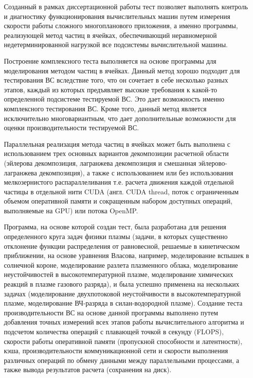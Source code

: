 Созданный в рамках диссертационной работы тест позволяет выполнять контроль и диагностику функционирования вычислительных машин путем измерения скорости работы сложного многопланового приложения, а именно программы, реализующей метод частиц в ячейках, обеспечивающий неравномерной недетерминированной нагрузкой все подсистемы вычислительной машины.

{\methods} Построение комплексного теста выполняется на основе программы для моделирования методом частиц в ячейках. Данный метод хорошо подходит для тестирования ВС вследствие того, что он сочетает в себе несколько разных этапов, каждый из которых предъявляет высокие требования к какой-то определенной подсистеме тестируемой ВС. Это дает возможность именно комплексного тестирования ВС. Кроме того, данный метод является исключительно многовариантным, что дает дополнительные возможности  для оценки производительности тестируемой ВС.

Параллельная реализация метода частиц в ячейках может быть выполнена с использованием трех основных вариантов декомпозиции расчетной области (эйлерова декомпозиция, лагранжева декомпозиция и смешанная эйлерово-лагранжева декомпозиция), а также с использованием или без использования мелкозернистого распараллеливания т.е. расчета движения каждой отдельной частицы в отдельной нити CUDA (англ. CUDA thread, поток с ограниченным объемом оперативной памяти и сокращенным набором доступных операций, выполняемые на GPU) или потока OpenMP. 

Программа, на основе которой создан тест, была разработана для решения определенного круга задач физики плазмы (задачи, в которых существенно отклонение функции распределения от равновесной, решаемые в кинетическом приближении, на основе уравнения Власова, например, моделирование вспышек в солнечной короне, моделирование разлета плазменного облака, моделирование неустойчивостей в высокотемпературной плазме, моделирование химических реакций в плазме газового разряда), и была успешно применена на нескольких задачах (моделирование двухпотоковой неустойчивости в высокотемпературной плазме, моделирование ВЧ-разряда в силан-водородной плазме). Создание теста производительности ВС на основе данной программы выполнено путем добавления точных измерений всех этапов работы вычислительного алгоритма и подсчетом количества операций с плавающей точкой в секунду (FLOPS), скорости работы оперативной памяти (пропускной способности и латентности), кэша, производительности коммуникационной сети и скорости выполнения различных операций по обмену данными между параллельными процессами, а также вывода результатов расчета (сохранения на диск).

